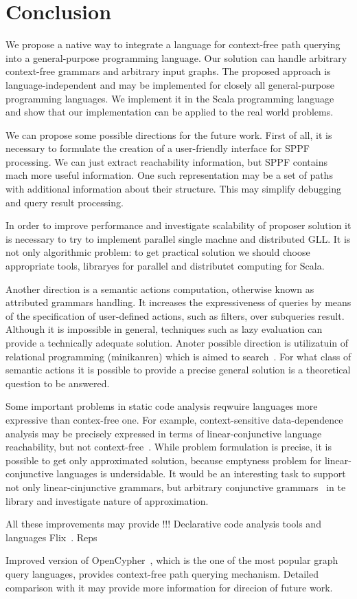 \section{Conclusion}

We propose a native way to integrate a language for context-free path querying into a general-purpose programming language.
Our solution can handle arbitrary context-free grammars and arbitrary input graphs.
The proposed approach is language-independent and may be implemented for closely all general-purpose programming languages.
We implement it in the Scala programming language and show that our implementation can be applied to the real world problems.

We can propose some possible directions for the future work.
First of all, it is necessary to formulate the creation of a user-friendly interface for SPPF processing.
We can just extract reachability information, but SPPF contains mach more useful information.
One such representation may be a set of paths with additional information about their structure.
This may simplify debugging and query result processing.

In order to improve performance and investigate scalability of proposer solution it is necessary to try to implement parallel single machne and distributed GLL.
It is not only algorithmic problem: to get practical solution we should choose appropriate tools, libraryes for parallel and distributet computing for Scala.

Another direction is a semantic actions computation, otherwise known as attributed grammars handling.
It increases the expressiveness of queries by means of the specification of user-defined actions, such as filters, over subqueries result. 
Although it is impossible in general, techniques such as lazy evaluation can provide a technically adequate solution.
Anoter possible direction is utilizatuin of relational programming (minikanren) which is aimed to search~\cite{DB}.
For what class of semantic actions it is possible to provide a precise general solution is a theoretical question to be answered. 

Some important problems in static code analysis reqwuire languages more expressive than contex-free one.
For example, context-sensitive data-dependence analysis may be precisely expressed in terms of linear-conjunctive language~\cite{Okhotin2003LCL} reachability, but not context-free~\cite{LCLReachability}.
While problem formulation is precise, it is possible to get only approximated solution, because emptyness problem for linear-conjunctive languages is undersidable.
It would be an interesting task to support not only linear-cinjunctive grammars, but arbitrary conjunctive grammars~\cite{okhotin2001conjunctive} in te library and investigate nature of approximation.

All these improvements may provide !!! Declarative code analysis tools and languages Flix~\cite{Flix}. Reps~\cite{Reps:1995}

Improved version of OpenCypher~\cite{OpenCypherPR}, which is the one of the most popular graph query languages, provides context-free path querying mechanism.
Detailed comparison with it may provide more information for direcion of future work.
